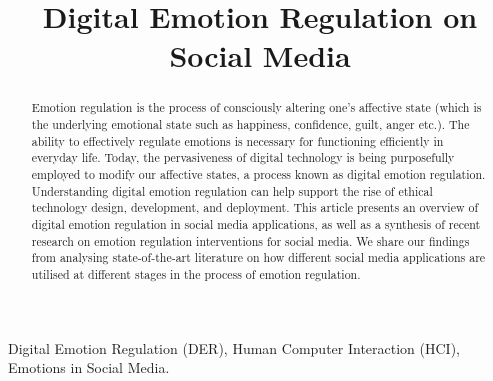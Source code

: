 \documentclass[lettersize,journal]{IEEEtran}
\begin{document}
\title{Digital Emotion Regulation on Social Media}

\author{

}





\maketitle

\begin{abstract}
Emotion regulation is the process of consciously altering one's affective state (which is the underlying emotional state such as happiness, confidence, guilt, anger etc.). The ability to effectively regulate emotions is necessary for functioning efficiently in everyday life. Today, the pervasiveness of digital technology is being purposefully employed to modify our affective states, a process known as digital emotion regulation. Understanding digital emotion regulation can help support the rise of ethical technology design, development, and deployment. This article presents an overview of digital emotion regulation in social media applications, as well as a synthesis of recent research on emotion regulation interventions for social media. We share our findings from analysing state-of-the-art literature on how different social media applications are utilised at different stages in the process of emotion regulation.
\end{abstract}

\begin{IEEEkeywords}
Digital Emotion Regulation (DER), Human Computer Interaction (HCI), Emotions in Social Media.
\end{IEEEkeywords}
\end{document}
